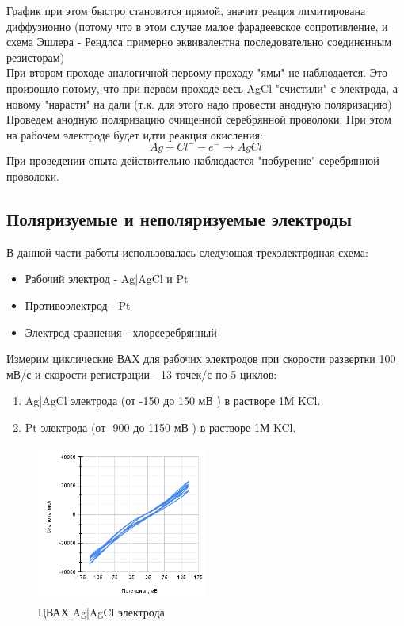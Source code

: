 \documentclass[a4paper,12pt]{article}
\begin{document}
График при этом быстро становится прямой, значит реация лимитирована диффузионно (потому что в этом случае малое фарадеевское сопротивление, и схема Эшлера - Рендлса примерно эквивалентна последовательно соединенным резисторам)\\
При втором проходе аналогичной первому проходу "ямы" не наблюдается. Это произошло потому, что при первом проходе весь AgCl "счистили" с электрода, а новому "нарасти" на дали (т.к. для этого надо провести анодную поляризацию)\\
Проведем анодную поляризацию очищенной серебрянной проволоки. При этом на рабочем электроде будет идти реакция окисления:
\begin{equation*}
 Ag + Cl^- - e^- \rightarrow AgCl
\end{equation*}
При проведении опыта действительно наблюдается "побурение" серебрянной проволоки.



\subsection{Поляризуемые и неполяризуемые электроды}
В данной части работы использовалась следующая трехэлектродная схема:
\begin{itemize}
    \item Рабочий электрод - Ag|AgCl и Pt
    \item Противоэлектрод - Pt
    \item Электрод сравнения - хлорсеребрянный
\end{itemize}
Измерим циклические ВАХ для рабочих электродов при скорости развертки 100 мВ/с и скорости регистрации - 13 точек/с по 5 циклов:
\begin{enumerate}
    \item Ag|AgCl электрода (от -150 до 150 мВ ) в растворе 1М KCl.
    \item Pt электрода (от -900 до 1150 мВ ) в растворе 1М KCl.
    \end{enumerate}

\begin{figure}[H]
    \centering
    \includegraphics[width = 0.5\textwidth]{201.png}
    \caption{ЦВАХ Ag|AgCl электрода}
    \label{fig:no_int}
\end{figure}\\
\end{document}
